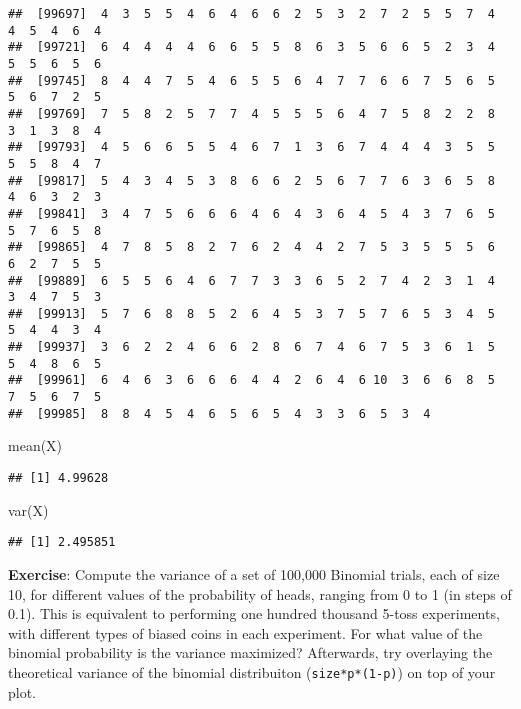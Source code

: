 \documentclass[
]{book}
\newenvironment{Shaded}{\begin{snugshade}}{\end{snugshade}}
\newcommand{\FunctionTok}[1]{\textcolor[rgb]{0.00,0.00,0.00}{#1}}
\newcommand{\NormalTok}[1]{#1}
\begin{document}
\begin{verbatim}
##  [99697]  4  3  5  5  4  6  4  6  6  2  5  3  2  7  2  5  5  7  4  4  5  4  6  4
##  [99721]  6  4  4  4  4  6  6  5  5  8  6  3  5  6  6  5  2  3  4  5  5  6  5  6
##  [99745]  8  4  4  7  5  4  6  5  5  6  4  7  7  6  6  7  5  6  5  5  6  7  2  5
##  [99769]  7  5  8  2  5  7  7  4  5  5  5  6  4  7  5  8  2  2  8  3  1  3  8  4
##  [99793]  4  5  6  6  5  5  4  6  7  1  3  6  7  4  4  4  3  5  5  5  5  8  4  7
##  [99817]  5  4  3  4  5  3  8  6  6  2  5  6  7  7  6  3  6  5  8  4  6  3  2  3
##  [99841]  3  4  7  5  6  6  6  4  6  4  3  6  4  5  4  3  7  6  5  5  7  6  5  8
##  [99865]  4  7  8  5  8  2  7  6  2  4  4  2  7  5  3  5  5  5  6  6  2  7  5  5
##  [99889]  6  5  5  6  4  6  7  7  3  3  6  5  2  7  4  2  3  1  4  3  4  7  5  3
##  [99913]  5  7  6  8  8  5  2  6  4  5  3  7  5  7  6  5  3  4  5  5  4  4  3  4
##  [99937]  3  6  2  2  4  6  6  2  8  6  7  4  6  7  5  3  6  1  5  5  4  8  6  5
##  [99961]  6  4  6  3  6  6  6  4  4  2  6  4  6 10  3  6  6  8  5  7  5  6  7  5
##  [99985]  8  8  4  5  4  6  5  6  5  4  3  3  6  5  3  4
\end{verbatim}

\begin{Shaded}
\begin{Highlighting}[]
\FunctionTok{mean}\NormalTok{(X)}
\end{Highlighting}
\end{Shaded}

\begin{verbatim}
## [1] 4.99628
\end{verbatim}

\begin{Shaded}
\begin{Highlighting}[]
\FunctionTok{var}\NormalTok{(X)}
\end{Highlighting}
\end{Shaded}

\begin{verbatim}
## [1] 2.495851
\end{verbatim}

\textbf{Exercise}: Compute the variance of a set of 100,000 Binomial trials, each of size 10, for different values of the probability of heads, ranging from 0 to 1 (in steps of 0.1). This is equivalent to performing one hundred thousand 5-toss experiments, with different types of biased coins in each experiment. For what value of the binomial probability is the variance maximized? Afterwards, try overlaying the theoretical variance of the binomial distribuiton (\texttt{size*p*(1-p)}) on top of your plot.
\end{document}
